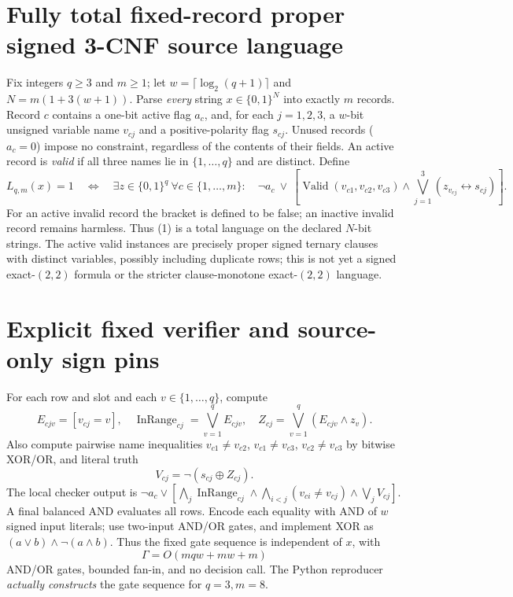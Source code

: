 \documentclass[11pt]{article}
\begin{document}
\section{Fully total fixed-record proper signed 3-CNF source language}
Fix integers $q\ge3$ and $m\ge1$; let $w=\lceil\log_2(q+1)\rceil$ and $N=m(1+3(w+1))$. Parse \emph{every} string $x\in\{0,1\}^N$ into exactly $m$ records. Record $c$ contains a one-bit active flag $a_c$, and, for each $j=1,2,3$, a $w$-bit unsigned variable name $v_{cj}$ and a positive-polarity flag $s_{cj}$. Unused records ($a_c=0$) impose no constraint, regardless of the contents of their fields. An active record is \emph{valid} if all three names lie in $\{1,\ldots,q\}$ and are distinct. Define
\[
 L_{q,m}(x)=1\quad\Longleftrightarrow\quad
 \exists z\in\{0,1\}^{q}\ \forall c\in\{1,\ldots,m\}:\quad
 \neg a_c\ \vee\ \left[\operatorname{Valid}(v_{c1},v_{c2},v_{c3})\wedge
 \bigvee_{j=1}^3(z_{v_{cj}}\leftrightarrow s_{cj})\right]. \tag{1}
\]
For an active invalid record the bracket is defined to be false; an inactive invalid record remains harmless. Thus (1) is a total language on the declared $N$-bit strings. The active valid instances are precisely proper signed ternary clauses with distinct variables, possibly including duplicate rows; this is not yet a signed exact-$(2,2)$ formula or the stricter clause-monotone exact-$(2,2)$ language.

\section{Explicit fixed verifier and source-only sign pins}
For each row and slot and each $v\in\{1,\ldots,q\}$, compute
\[
 E_{cjv}=[v_{cj}=v],\quad
 \operatorname{InRange}_{cj}=\bigvee_{v=1}^qE_{cjv},\quad
 Z_{cj}=\bigvee_{v=1}^q(E_{cjv}\wedge z_v).
\]
Also compute pairwise name inequalities $v_{c1}\ne v_{c2}$, $v_{c1}\ne v_{c3}$, $v_{c2}\ne v_{c3}$ by bitwise XOR/OR, and literal truth
\[
 V_{cj}=\neg(s_{cj}\oplus Z_{cj}).
\]
The local checker output is $\neg a_c\vee[\bigwedge_j\operatorname{InRange}_{cj}\wedge\bigwedge_{i<j}(v_{ci}\ne v_{cj})\wedge\bigvee_j V_{cj}]$. A final balanced AND evaluates all rows. Encode each equality with AND of $w$ signed input literals; use two-input AND/OR gates, and implement XOR as $(a\vee b)\wedge\neg(a\wedge b)$. Thus the fixed gate sequence is independent of $x$, with
\[
 \Gamma=O(mqw+mw+m)\tag{2}
\]
AND/OR gates, bounded fan-in, and no decision call. The Python reproducer \emph{actually constructs} the gate sequence for $q=3,m=8$.
\end{document}
